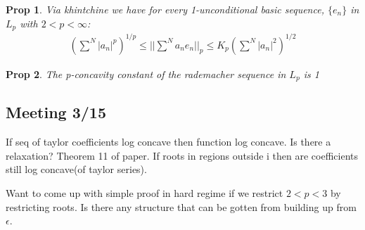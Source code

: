 \documentclass[11pt]{article}
\newtheorem{prop}{Prop}
\theoremstyle{remark}
\begin{document}
\begin{prop}
	Via khintchine we have for every 1-unconditional basic sequence, $\{e_n\}$ in $L_p$ with $2 < p < \infty$:
	\begin{align*}
		(\sum^N |a_n|^p)^{1/p} \leq || \sum^N a_n e_n||_p \leq K_p (\sum^N |a_n|^2)^{1/2}
	\end{align*}
\end{prop}

\begin{prop}
	The p-concavity constant of the rademacher sequence in $L_p$ is 1
\end{prop}

\subsection{Meeting 3/15}

\begin{remark}
	If seq of taylor coefficients log concave then function log concave. Is there a relaxation? Theorem 11 of paper. If roots in regions outside i then are coefficients still log concave(of taylor series). 
\end{remark}

\begin{remark}
	Want to come up with simple proof in hard regime if we restrict $2 < p < 3$ by restricting roots. Is there any structure that can be gotten from building up from $\epsilon$. 
\end{remark}
\end{document}
